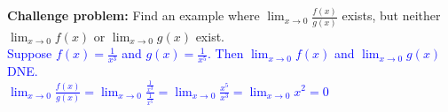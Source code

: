 \documentclass{ximera}
\begin{document}
\begin{exercise}
     \textbf{Challenge problem: }Find an example where $\displaystyle \lim_{x\rightarrow 0} \frac{f(x)}{g(x)}$ exists, but neither $\displaystyle\lim_{x\rightarrow 0}f(x)$ or $\displaystyle \lim_{x\rightarrow 0}g(x)$ exist.\\
     \textcolor{blue}{ Suppose $f(x)=\frac{1}{x^3}$ and $g(x)=\frac{1}{x^5}$.  Then $\lim_{x\rightarrow 0}f(x)$ and $\lim_{x\rightarrow 0}g(x)$ DNE.\\
 $\displaystyle\lim_{x\rightarrow 0}\frac{f(x)}{g(x)}=\lim_{x\rightarrow 0}\frac{\frac{1}{x^3}}{\frac{1}{x^5}}=\lim_{x\rightarrow 0}\frac{x^5}{x^3}=\lim_{x\rightarrow 0}x^2=0$ }\\
\end{exercise}
\end{document}
